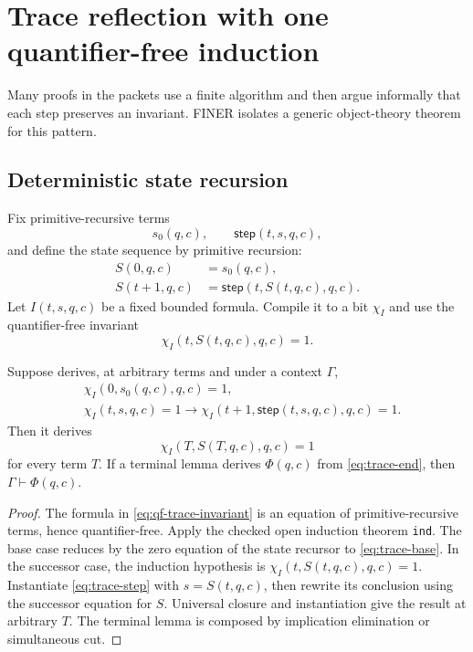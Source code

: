 \section{Trace reflection with one quantifier-free induction}
\label{sec:trace}

Many proofs in the packets use a finite algorithm and then argue informally that each step preserves an invariant.  FINER isolates a generic object-theory theorem for this pattern.

\subsection{Deterministic state recursion}

Fix primitive-recursive terms
\[
  s_0(q,c),\qquad \mathsf{step}(t,s,q,c),
\]
and define the state sequence by primitive recursion:
\begin{align*}
 S(0,q,c)&=s_0(q,c),\\
 S(t+1,q,c)&=\mathsf{step}(t,S(t,q,c),q,c).
\end{align*}
Let \(I(t,s,q,c)\) be a fixed bounded formula.  Compile it to a bit \(\chi_I\) and use the quantifier-free invariant
\begin{equation}
  \chi_I(t,S(t,q,c),q,c)=1.
  \label{eq:qf-trace-invariant}
\end{equation}

\begin{theorem}
\label{thm:trace-reflection}
Suppose \iPRA{} derives, at arbitrary terms and under a context \(\Gamma\),
\begin{align}
 &\chi_I(0,s_0(q,c),q,c)=1,\label{eq:trace-base}\\
 &\chi_I(t,s,q,c)=1\to
   \chi_I(t+1,\mathsf{step}(t,s,q,c),q,c)=1.
   \label{eq:trace-step}
\end{align}
Then it derives
\begin{equation}
  \chi_I(T,S(T,q,c),q,c)=1
  \label{eq:trace-end}
\end{equation}
for every term \(T\).  If a terminal lemma derives \(\Phi(q,c)\) from \eqref{eq:trace-end}, then \(\Gamma\vdash\Phi(q,c)\).
\end{theorem}

\begin{proof}
The formula in \eqref{eq:qf-trace-invariant} is an equation of primitive-recursive terms, hence quantifier-free.  Apply the checked open induction theorem \texttt{ind}.  The base case reduces by the zero equation of the state recursor to \eqref{eq:trace-base}.  In the successor case, the induction hypothesis is \(\chi_I(t,S(t,q,c),q,c)=1\).  Instantiate \eqref{eq:trace-step} with \(s=S(t,q,c)\), then rewrite its conclusion using the successor equation for \(S\).  Universal closure and instantiation give the result at arbitrary \(T\).  The terminal lemma is composed by implication elimination or simultaneous cut.
\end{proof}

